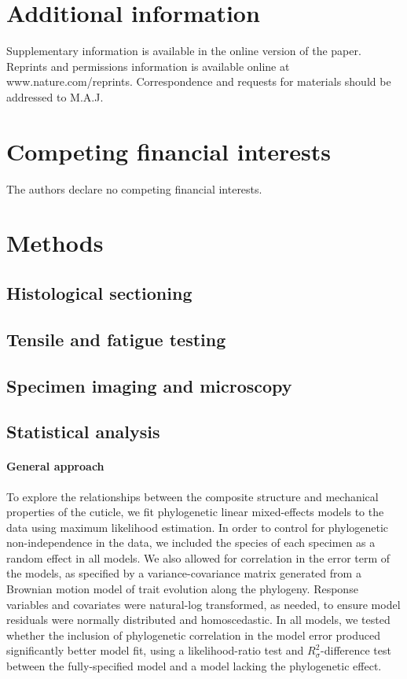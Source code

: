 \documentclass[twocolumn, linenumbers, superscriptaddress]{revtex4-1}
\begin{document}
	\section*{Additional information}
		Supplementary information is available in the online version of the paper.
		Reprints and permissions information is available online at www.nature.com/reprints.
		Correspondence and requests for materials should be addressed to M.A.J.
	
	\section*{Competing financial interests}
		The authors declare no competing financial interests.
	
	\newpage

	\section*{Methods}
		\subsection*{Histological sectioning}
			
		\subsection*{Tensile and fatigue testing}

		\subsection*{Specimen imaging and microscopy}
			
		\subsection*{Statistical analysis}
			\paragraph*{General approach}
				To explore the relationships between the composite structure and mechanical properties of the cuticle, we fit phylogenetic linear mixed-effects models to the data using maximum likelihood estimation.
				In order to control for phylogenetic non-independence in the data, we included the species of each specimen as a random effect in all models.
				We also allowed for correlation in the error term of the models, as specified by a variance-covariance matrix generated from a Brownian motion model of trait evolution along the phylogeny.
				Response variables and covariates were natural-log transformed, as needed, to ensure model residuals were normally distributed and homoscedastic.
				In all models, we tested whether the inclusion of phylogenetic correlation in the model error produced significantly better model fit, using a likelihood-ratio test and $R^{2}_{\sigma}$-difference test between the fully-specified model and a model lacking the phylogenetic effect.
\end{document}

